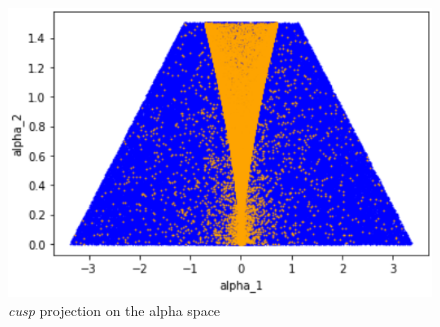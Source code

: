 \documentclass[10pt,a4paper]{article}
\begin{document}
\begin{figure}[H]
    \centering
    \includegraphics[scale=1]{images/cusp.png}
    \caption{\textit{cusp} projection on the alpha space}
    \label{fig:cusp-projection}
\end{figure}
\end{document}
